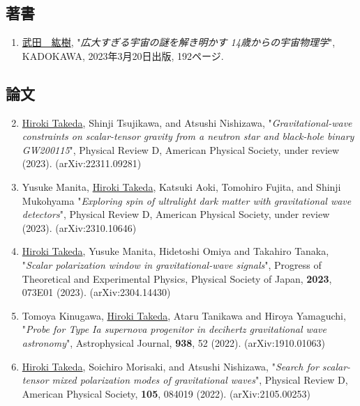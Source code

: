 \documentclass[uplatex, 11pt]{jsarticle}
\begin{document}
\subsection*{著書}
\begin{enumerate}
\item \uline{武田　紘樹}, "\emph{広大すぎる宇宙の謎を解き明かす 14歳からの宇宙物理学}", KADOKAWA, 2023年3月20日出版, 192ページ.
\end{enumerate}

\subsection*{論文}
\begin{enumerate}
\setcounter{enumi}{1}
\item \uline{Hiroki Takeda}, Shinji Tsujikawa, and Atsushi Nishizawa,
"\emph{Gravitational-wave constraints on scalar-tensor gravity from a neutron star and black-hole binary GW200115}",
Physical Review D, American Physical Society, under review (2023).
(arXiv:22311.09281)\\

   \item Yusuke Manita, \uline{Hiroki Takeda}, Katsuki Aoki, Tomohiro Fujita, and Shinji Mukohyama
"\emph{Exploring spin of ultralight dark matter with gravitational wave detectors}",
Physical Review D, American Physical Society, under review (2023).
(arXiv:2310.10646)\\

\item \uline{Hiroki Takeda}, Yusuke Manita, Hidetoshi Omiya and Takahiro Tanaka, "\emph{Scalar polarization window in gravitational-wave signals}", Progress of Theoretical and Experimental Physics, Physical Society of Japan, {\bf 2023}, 073E01 (2023). (arXiv:2304.14430)\\

\item Tomoya Kinugawa, \uline{Hiroki Takeda}, Ataru Tanikawa and Hiroya Yamaguchi, "\emph{Probe for Type Ia supernova progenitor in decihertz gravitational wave astronomy}", Astrophysical Journal, {\bf 938}, 52 (2022). (arXiv:1910.01063)\\

\item \uline{Hiroki Takeda}, Soichiro Morisaki, and Atsushi Nishizawa,
"\emph{Search for scalar-tensor mixed polarization modes of gravitational waves}",
Physical Review D, American Physical Society, {\bf 105}, 084019 (2022).
(arXiv:2105.00253)\\


\end{enumerate}
\end{document}
